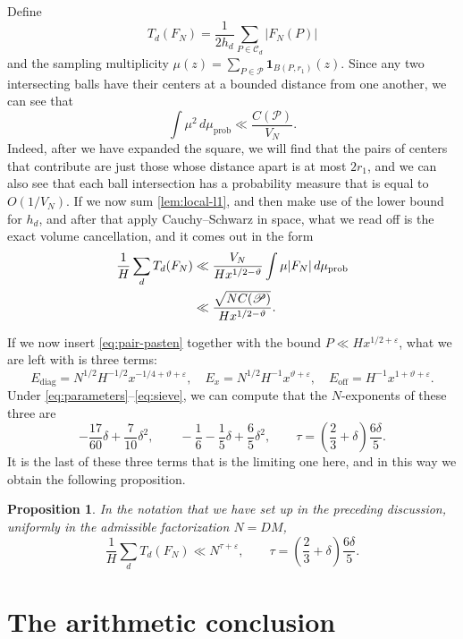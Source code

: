 \documentclass[11pt,reqno]{amsart}
\newtheorem{proposition}[theorem]{Proposition}
\theoremstyle{definition}
\newcommand{\eps}{\varepsilon}
\begin{document}
Define
\[
 T_d(F_N)=\frac1{2h_d}\sum_{P\in\mathscr C_d}|F_N(P)|
\]
and the sampling multiplicity
$\mu(z)=\sum_{P\in\mathscr P}\mathbf 1_{B(P,r_1)}(z)$.  Since any two intersecting balls have their centers at a bounded distance from one another, we can see that
\[
 \int\mu^2\,d\mu_{\mathrm{prob}}\ll \frac{C(\mathscr P)}{V_N}.
\] Indeed, after we have expanded the square, we will find that the pairs of
centers that contribute are just those whose distance apart is at most
$2r_1$, and we can also see that each ball intersection has a probability
measure that is equal to $O(1/V_N)$.
If we now sum \cref{lem:local-l1}, and then make use of the lower bound for $h_d$, and after that apply Cauchy--Schwarz in space, what we read off is the exact volume cancellation, and it comes out in the form
\begin{align}
 \frac1H\sum_dT_d(F_N)
 &\ll\frac{V_N}{Hx^{1/2-\vartheta}}
 \int\mu|F_N|\,d\mu_{\mathrm{prob}}\notag\\
 &\ll\frac{\sqrt{NC(\mathscr P)}}{Hx^{1/2-\vartheta}}.
 \label{eq:first-moment-basic}
\end{align}

If we now insert \eqref{eq:pair-pasten} together with the bound $P\ll Hx^{1/2+\eps}$, what we are left with is three terms:
\[
 E_{\mathrm{diag}}=N^{1/2}H^{-1/2}x^{-1/4+\vartheta+\eps},\quad
 E_x=N^{1/2}H^{-1}x^{\vartheta+\eps},\quad
 E_{\mathrm{off}}=H^{-1}x^{1+\vartheta+\eps}.
\]
Under \eqref{eq:parameters}--\eqref{eq:sieve}, we can compute that the $N$-exponents of these three are
\[
 -\frac{17}{60}\delta+\frac7{10}\delta^2,\qquad
 -\frac16-\frac15\delta+\frac65\delta^2,\qquad
 \tau=\left(\frac23+\delta\right)\frac{6\delta}{5}.
\]
It is the last of these three terms that is the limiting one here, and in this way we obtain the following proposition.

\begin{proposition}\label{prop:first-moment}
In the notation that we have set up in the preceding discussion, uniformly
in the admissible factorization $N=DM$,
\[
 \frac1H\sum_dT_d(F_N)\ll N^{\tau+\eps},
 \qquad
 \tau=\left(\frac23+\delta\right)\frac{6\delta}{5}.
\]
\end{proposition}

\newpage
\section{The arithmetic conclusion}\label{sec:pasten}
\end{document}
